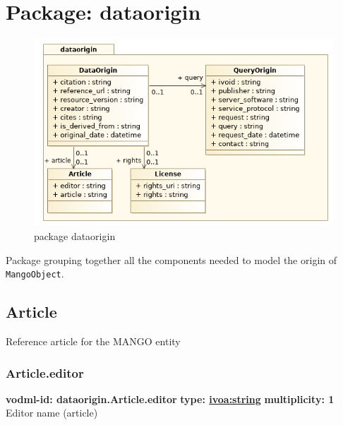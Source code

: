\section{Package: dataorigin }
  \begin{figure}[h]
    \includegraphics[width=1.0\textwidth]{../model/dataorigin.png}
    \caption{package dataorigin}
    \label{fig:dataorigin}
  \end{figure}




  Package grouping together all the components needed to model the origin of \texttt{MangoObject}.

  \subsection{Article}
  \label{sect:dataorigin.Article}
    Reference article for the MANGO entity

    \subsubsection{Article.editor}
      \textbf{vodml-id: dataorigin.Article.editor} \newline
      \textbf{type: \hyperref[sect:ivoa]{ivoa:string}} \newline
      \textbf{multiplicity: 1} \newline 
      Editor name (article)

